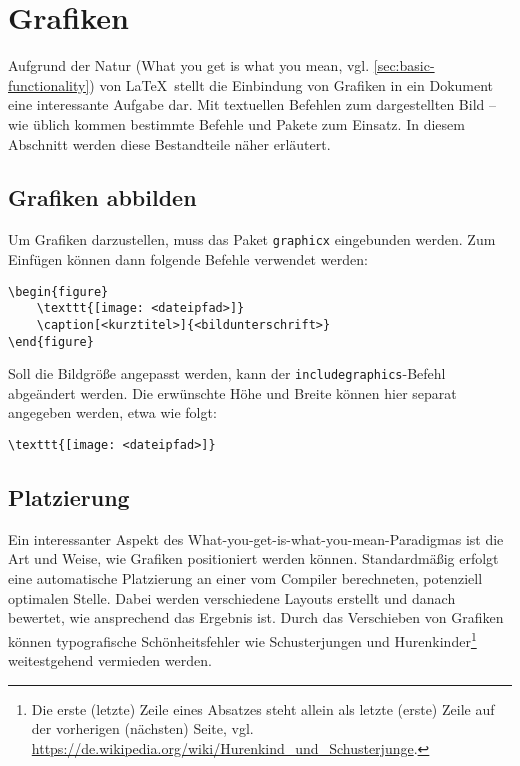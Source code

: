\chapter{Grafiken}
\label{sec:graphics}

Aufgrund der Natur (What you get is what you mean, vgl. \cref{sec:basic-functionality}) von \LaTeX \  stellt die Einbindung von Grafiken in ein Dokument eine interessante Aufgabe dar. Mit textuellen Befehlen zum dargestellten Bild -- wie üblich kommen bestimmte Befehle und Pakete zum Einsatz. In diesem Abschnitt werden diese Bestandteile näher erläutert.

\section{Grafiken abbilden}
\label{sec:display-graphics}
Um Grafiken darzustellen, muss das Paket \texttt{graphicx} eingebunden werden. Zum Einfügen können dann folgende Befehle verwendet werden:  

\begin{verbatim}
\begin{figure}
	\texttt{[image: <dateipfad>]}
	\caption[<kurztitel>]{<bildunterschrift>}
\end{figure}
\end{verbatim}

\noindent Soll die Bildgröße angepasst werden, kann der \texttt{includegraphics}-Befehl abgeändert werden. 
Die erwünschte Höhe und Breite können hier separat angegeben werden, etwa wie folgt: 

\begin{verbatim}
\texttt{[image: <dateipfad>]}
\end{verbatim}

\section{Platzierung}
\label{sec:graphics-placement}
Ein interessanter Aspekt des What-you-get-is-what-you-mean-Paradigmas ist die Art und Weise, wie Grafiken positioniert werden können. 
Standardmäßig erfolgt eine automatische Platzierung an einer vom Compiler berechneten, potenziell optimalen Stelle.
Dabei werden verschiedene Layouts erstellt und danach bewertet, wie ansprechend das Ergebnis ist.
Durch das Verschieben von Grafiken können typografische Schönheitsfehler wie Schusterjungen und Hurenkinder\footnote{Die erste (letzte) Zeile eines Absatzes steht allein als letzte (erste) Zeile auf der vorherigen (nächsten) Seite, vgl. \url{https://de.wikipedia.org/wiki/Hurenkind_und_Schusterjunge}.} weitestgehend vermieden werden. 

